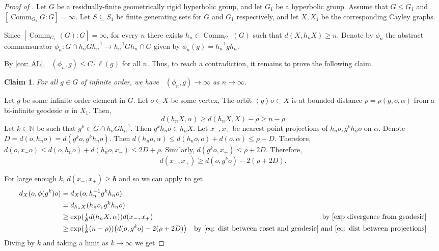 \documentclass{amsart}
\numberwithin{equation}{section}
\newtheorem{claim}[theorem]{Claim}
\theoremstyle{definition}
\newcommand{\bbN}{\mathbb{N}}
\newcommand{\ii}{^{-1}}
\newcommand{\gen}[1]{\left< #1 \right>}
\newcommand{\bdelta}{{\boldsymbol\delta}}
\DeclareMathOperator{\Comm}{Comm}
\DeclareMathOperator{\AL}{\ell_{Avg}}
\begin{document}
\begin{proof}[Proof of ]
Let $G$ be a  residually-finite geometrically rigid hyperbolic group, and let $G_1$ be a hyperbolic group. Assume that $G\le G_1$ and $[\Comm_{G_1}G:G]=\infty$.
Let $S\subseteq S_1$ be finite generating sets for $G$ and $G_1$ respectively, and let $X,X_1$ be the corresponding Cayley graphs. 

Since $[\Comm_{G_1}(G):G]=\infty$, for every $n$ there exists $h_n\in \Comm_{G_1}(G)$ such that $d(X,h_nX)\ge n$.
Denote by $\phi_n$ the abstract commensurator $\phi_n:G\cap h_nGh_n\ii \to h_n\ii G h_n \cap G$ given by $\phi_n(g)=h_n\ii gh_n$.

By \cref{cor: AL}, $\AL(\phi_n,g)\le C\cdot \ell(g)$ for all $n$. Thus, to reach a contradiction, it remains to prove the following claim.


\begin{claim}
    For all $g\in G$ of infinite order, we have $\AL(\phi_n,g)\to \infty $ as $n\to \infty$.
\end{claim}

Let $g$ be some infinite order element in $G$. 
Let $o\in X$ be some vertex, 
The orbit $\gen{g}o\subset X$ is at bounded distance $\rho=\rho(g,o,\alpha)$ from a bi-infinite geodesic $\alpha$ in $X_1$.
Then, \begin{equation}\label{eq: dist between coset and geodesic}
    d(h_nX,\alpha)\ge d(h_nX,X)-\rho\ge n-\rho
\end{equation}
Let $k\in \bbN$ be such that $g^k\in G \cap h_nGh_n\ii$.
Then $g^k h_no\in h_nX$. 
Let $x_-,x_+$ be nearest point projections of $h_no,g^kh_no$ on $\alpha$. 
Denote $D = d(o,h_no)=d(g^ko,g^k h_no)$.
Then $d(h_no,\alpha)\le d(h_no,o)+d(o,\alpha )\le \rho+D$.
Therefore, $d(o,x_-o)\le d(o,h_no)+d(h_no,x_-)\le 2D+\rho$.
Similarly, $d(g^ko,x_+)\le \rho+2D$.
Therefore, \begin{equation}\label{eq: dist between projections}
    d(x_-,x_+)\ge d(o,g^ko)-2(\rho+2D).
\end{equation}

For large enough $k$, $d(x_-,x_+)\ge \bdelta$ and so we can apply  to get
\begin{align*}
d_X(o,\phi(g^k)o)&=d_X(o,h_n\ii g^k h_no)\\
&=d_{h_nX}(h_no,g^kh_no)
\\
&\ge \exp(\tfrac 1\bdelta d(h_nX,\alpha)) d(x_-,x_+) &\text{by \cref{exp divergence from geodesic}}\\
&\ge \exp(\tfrac 1 \bdelta (n-\rho))\big(d(o,g^ko)-2(\rho+2D)\big) &\text{by \eqref{eq: dist between coset and geodesic} and \eqref{eq: dist between projections}}
\end{align*}
Diving by $k$ and taking a limit as $k\to \infty$ we get


\end{proof}
\end{document}
